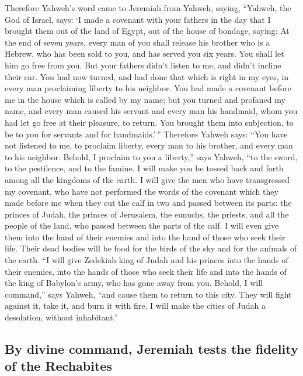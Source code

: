  Therefore Yahweh's word came to Jeremiah from Yahweh,
saying,  ``Yahweh, the God of Israel, says: `I made a
covenant with your fathers in the day that I brought them out of the
land of Egypt, out of the house of bondage, saying:  At
the end of seven years, every man of you shall release his brother who
is a Hebrew, who has been sold to you, and has served you six years. You
shall let him go free from you. But your fathers didn't listen to me,
and didn't incline their ear.  You had now turned, and
had done that which is right in my eyes, in every man proclaiming
liberty to his neighbor. You had made a covenant before me in the house
which is called by my name;  but you turned and profaned
my name, and every man caused his servant and every man his handmaid,
whom you had let go free at their pleasure, to return. You brought them
into subjection, to be to you for servants and for handmaids.'\,''
 Therefore Yahweh says: ``You have not listened to me, to
proclaim liberty, every man to his brother, and every man to his
neighbor. Behold, I proclaim to you a liberty,'' says Yahweh, ``to the
sword, to the pestilence, and to the famine. I will make you be tossed
back and forth among all the kingdoms of the earth.  I
will give the men who have transgressed my covenant, who have not
performed the words of the covenant which they made before me when they
cut the calf in two and passed between its parts:  the
princes of Judah, the princes of Jerusalem, the eunuchs, the priests,
and all the people of the land, who passed between the parts of the
calf.  I will even give them into the hand of their
enemies and into the hand of those who seek their life. Their dead
bodies will be food for the birds of the sky and for the animals of the
earth.  ``I will give Zedekiah king of Judah and his
princes into the hands of their enemies, into the hands of those who
seek their life and into the hands of the king of Babylon's army, who
has gone away from you.  Behold, I will command,'' says
Yahweh, ``and cause them to return to this city. They will fight against
it, take it, and burn it with fire. I will make the cities of Judah a
desolation, without inhabitant.''

\hypertarget{by-divine-command-jeremiah-tests-the-fidelity-of-the-rechabites}{%
\subsection{By divine command, Jeremiah tests the fidelity of the
Rechabites}\label{by-divine-command-jeremiah-tests-the-fidelity-of-the-rechabites}}

